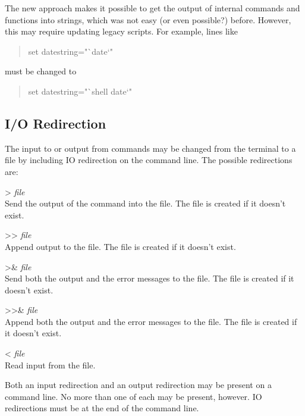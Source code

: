 The new approach makes it possible to get the output of internal
{\WRspice} commands and functions into strings, which was not easy (or
even possible?) before.  However, this may require updating legacy
scripts.  For example, lines like
\begin{quote}\vt
set datestring="`date`"
\end{quote}
must be changed to
\begin{quote}\vt
set datestring="`shell date`"
\end{quote}


\subsection{I/O Redirection}


The input to or output from commands may be changed from the terminal
to a file by including IO redirection on the command line.  The
possible redirections are:

\begin{description}
\item{ \vt >} {\it file}\\
Send the output of the command into the file.  The file is created if
it doesn't exist.

\item{\vt >>} {\it file}\\
Append output to the file.  The file is created if it doesn't exist.

\item{\vt >\&} {\it file}\\
Send both the output and the error messages to the file.  The file is
created if it doesn't exist.

\item{\vt >>\&} {\it file}\\
Append both the output and the error messages to the file.  The file
is created if it doesn't exist.

\item{\vt <} {\it file}\\
Read input from the file.
\end{description}

Both an input redirection and an output redirection may be present
on a command line.  No more than one of each may be present,
however.  IO redirections must be at the end of the command line.

